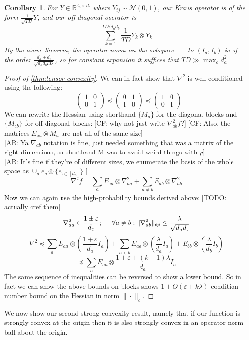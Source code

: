 \documentclass{article}
\newtheorem{corollary}[theorem]{Corollary}
\newcommand{\R}{{\mathbb{R}}}
\newcommand\eps{\varepsilon}
\newcommand{\CF}[1]{{\color{purple}[CF: #1]}}
\newcommand{\AR}[1]{{\color{orange}[AR: #1]}}
\newcommand{\TODO}[1]{{\color{blue}[TODO: #1]}}
\begin{document}
\begin{corollary}
For $Y \in \R^{d_{a} \times d_{b}}$ where $Y_{ij} \sim \mathcal{N}(0,1)$, our Kraus operator is of the form $\frac{1}{\sqrt{TD}} Y$, and our off-diagonal operator is
\[ \sum_{k=1}^{TD/d_{a}d_{b}} \frac{1}{TD} Y_{k} \otimes Y_{k}   \]
By the above theorem, the operator norm on the subspace $\perp$ to $(I_{a},I_{b})$ is of the order $\frac{d_{a}+d_{b}}{\sqrt{d_{a} d_{b} TD}}$, so for constant expansion it suffices that $TD \gg \max_{a} d_{a}^{2}$
\end{corollary}
\begin{proof}[Proof of \cref{thm:tensor-convexity}]
We can in fact show that $\nabla^{2}$ is well-conditioned using the following:
\[ -\begin{pmatrix} 1 & 0 \\ 0 & 1 \end{pmatrix}
\preceq \begin{pmatrix} 0 & 1 \\ 1 & 0 \end{pmatrix}
\preceq \begin{pmatrix} 1 & 0 \\ 0 & 1 \end{pmatrix}
\]
We can rewrite the Hessian using shorthand $\{M_{a}\}$ for the diagonal blocks and $\{M_{ab}\}$ for off-diagonal blocks: \CF{why not just write $\nabla^2_{ab}f$?} \CF{Also, the matrices $E_{aa} \otimes M_a$ are not all of the same size} 
\\ \AR{Ya $\nabla_{ab}$ notation is fine, just needed something that was a matrix of the right dimensions, so shorthand M was to avoid weird things with $\rho$}
\\ \AR{It's fine if they're of different sizes, we enumerate the basis of the whole space as $\cup_{a} e_{a} \otimes \{e_{i \in [d_{a}]}\}$ }
\[ \nabla^{2} f = \sum_{a} E_{aa} \otimes \nabla^{2}_{aa} + \sum_{a \neq b} E_{ab} \otimes \nabla^{2}_{ab}  \]
Now we can again use the high-probability bounds derived above: \TODO{actually cref them}
\[ \nabla^{2}_{aa} \in \frac{1 \pm \eps}{d_{a}}; \hspace{5mm} \forall a \neq b: \|\nabla^{2}_{ab}\|_{op} \leq \frac{\lambda}{\sqrt{d_{a} d_{b}}}   \]
\[ \nabla^{2} \preceq \sum_{a} E_{aa} \otimes \left( \frac{1+\eps}{d_{a}} I_{a} \right) + \sum_{a < b} E_{aa} \otimes \left( \frac{\lambda}{d_{a}} I_{a} \right) + E_{bb} \otimes \left( \frac{\lambda}{d_{b}} I_{b} \right)    \]
\[ \preceq \sum_{a} E_{aa} \otimes \frac{1+\eps+(k-1)\lambda}{d_{a}} I_{a}  \]
The same sequence of inequalities can be reversed to show a lower bound. So in fact we can show the above bounds on blocks shows $1+O(\eps + k \lambda)$-condition number bound on the Hessian in norm $\|\cdot\|_{d}$.
\end{proof}
We now show our second strong convexity result, namely that if our function is strongly convex at the origin then it is also strongly convex in an operator norm ball about the origin.
\end{document}
